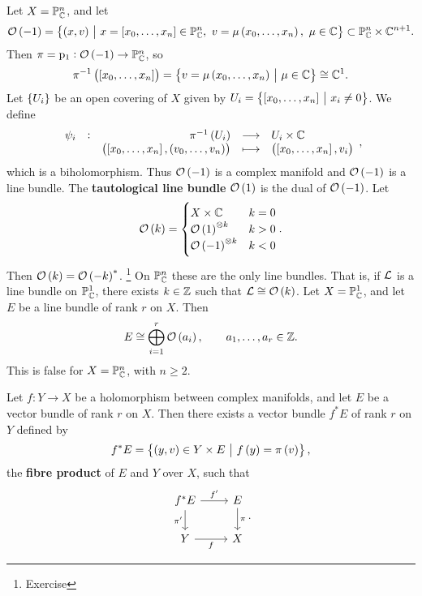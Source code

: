 \begin{example}
Let $ X = \mathbb{P}_{\mathbb{C}}^n $, and let
$$ \OOO\br{-1} = \cbr{\br{x, v} \st x = \sbr{x_0, \dots, x_n} \in \PP_\CC^n, \ v = \mu\br{x_0, \dots, x_n}, \ \mu \in \CC} \subset \PP_\CC^n \times \CC^{n + 1}. $$
Then $ \pi = \p_1 : \OOO\br{-1} \to \PP_\CC^n $, so
$$ \pi^{-1}\br{\sbr{x_0, \dots, x_n}} = \cbr{v = \mu\br{x_0, \dots, x_n} \st \mu \in \CC} \cong \CC^1. $$
Let $ \cbr{U_i} $ be an open covering of $ X $ given by $ U_i = \cbr{\sbr{x_0, \dots, x_n} \st x_i \ne 0} $. We define
$$ \function[\psi_i]{\pi^{-1}\br{U_i}}{U_i \times \CC}{\br{\sbr{x_0, \dots, x_n}, \br{v_0, \dots, v_n}}}{\br{\sbr{x_0, \dots, x_n}, v_i}}, $$
which is a biholomorphism. Thus $ \OOO\br{-1} $ is a complex manifold and $ \OOO\br{-1} $ is a line bundle. The \textbf{tautological line bundle} $ \OOO\br{1} $ is the dual of $ \OOO\br{-1} $. Let
$$ \OOO\br{k} =
\begin{cases}
X \times \CC & k = 0 \\
\OOO\br{1}^{\otimes k} & k > 0 \\
\OOO\br{-1}^{\otimes k} & k < 0
\end{cases}.
$$
Then $ \OOO\br{k} = \OOO\br{-k}^* $. \footnote{Exercise} On $ \mathbb{P}_{\mathbb{C}}^n $ these are the only line bundles. That is, if $ \mathcal{L} $ is a line bundle on $ \mathbb{P}_{\mathbb{C}}^1 $, there exists $ k \in \mathbb{Z} $ such that $ \LLL \cong \OOO\br{k} $. Let $ X = \mathbb{P}_{\mathbb{C}}^1 $, and let $ E $ be a line bundle of rank $ r $ on $ X $. Then
$$ E \cong \bigoplus_{i = 1}^r \OOO\br{a_i}, \qquad a_1, \dots, a_r \in \ZZ. $$
This is false for $ X = \mathbb{P}_{\mathbb{C}}^n $, with $ n \ge 2 $.
\end{example}

\pagebreak

\begin{definition}
Let $ f : Y \to X $ be a holomorphism between complex manifolds, and let $ E $ be a vector bundle of rank $ r $ on $ X $. Then there exists a vector bundle $ f^*E $ of rank $ r $ on $ Y $ defined by
$$ f^*E = \cbr{\br{y, v} \in Y \times E \st f\br{y} = \pi\br{v}}, $$
the \textbf{fibre product} of $ E $ and $ Y $ over $ X $, such that
$$
\begin{tikzcd}
f^*E \arrow{r}{f'} \arrow[swap]{d}{\pi'} & E \arrow{d}{\pi} \\
Y \arrow[swap]{r}{f} & X
\end{tikzcd}.
$$
\end{definition}


